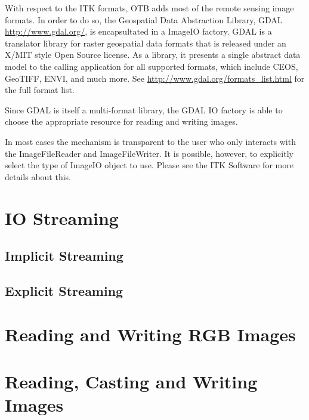 With respect to the ITK formats, OTB adds most of the remote sensing
image formats. In order to do so, the Geospatial Data Abstraction Library, GDAL
      \url{http://www.gdal.org/}, is encapsultated in a ImageIO
      factory. GDAL is a translator library for raster
      geospatial data formats that is released under an X/MIT style
      Open Source license. As a library, it presents a single abstract
      data model to the calling application for all supported formats,
      which include CEOS, GeoTIFF, ENVI, and much more. See
      \url{http://www.gdal.org/formats_list.html} for
      the full format list.

      Since GDAL is itself a multi-format library, the GDAL IO
factory is able to choose the appropriate resource for reading and
writing images.

In most cases the mechanism is transparent to the user who only interacts
with the ImageFileReader and ImageFileWriter. It is
possible, however, to explicitly select the type of ImageIO object
to use.  Please see the ITK Software for more details about this.

%

\section{IO Streaming}
\label{sec:IOStreaming}
\subsection{Implicit Streaming}
\label{sec:ImplicitIOStreaming}


\subsection{Explicit Streaming}
\label{sec:ExplicitIOStreaming}



\section{Reading and Writing RGB Images}
\label{sec:RGBImagReadWrite}


\section{Reading, Casting and Writing Images}
\label{sec:ImagReadCastWrite}


